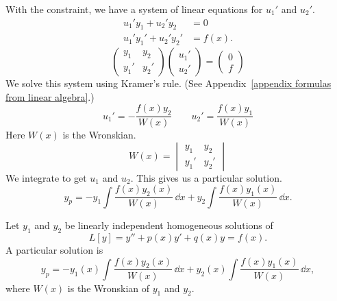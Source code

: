 With the constraint, we have a system of linear equations for $u_1'$ and $u_2'$.
\begin{align*}
  u_1'y_1  + u_2'y_2  &= 0 \\
  u_1'y_1' + u_2'y_2' &= f(x).  
\end{align*}
\[
\begin{pmatrix}
  y_1 & y_2 \\
  y_1' & y_2'
\end{pmatrix}
\begin{pmatrix}
  u_1' \\
  u_2'
\end{pmatrix}
=
\begin{pmatrix}
  0 \\
  f
\end{pmatrix}
\]
We solve this system using Kramer's rule.
(See Appendix~\ref{appendix formulas from linear algebra}.)
\[
u_1' = -\frac{f(x)y_2}{W(x)} \qquad  u_2' = \frac{f(x)y_1}{W(x)}
\]
Here $W(x)$ is the Wronskian.
\[
W(x) =
\begin{vmatrix}
  y_1 & y_2 \\
  y_1' & y_2'
\end{vmatrix}
\]
We integrate to get $u_1$ and $u_2$.  This gives us a particular solution.
\[ 
y_p = -y_1 \int \frac{f(x) y_2(x)}{W(x)}\,\dd x +
y_2 \int \frac{f(x) y_1(x)}{W(x)}\,\dd x. 
\]






\begin{Result}
  Let $y_1$ and $y_2$ be linearly independent homogeneous solutions of
  \[
  L[y] = y'' + p(x)y' + q(x)y = f(x).
  \]
  A particular solution is
  \[ 
  y_p = -y_1(x) \int \frac{f(x) y_2(x)}{W(x)}\,\dd x +
  y_2(x) \int \frac{f(x) y_1(x)}{W(x)}\,\dd x, 
  \]
  where $W(x)$ is the Wronskian of $y_1$ and $y_2$.
\end{Result}








